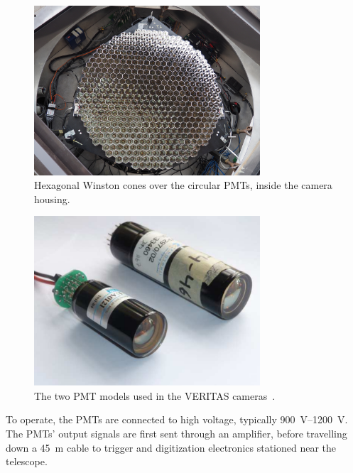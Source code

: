 \begin{figure}[ht]
  \centering
  \includegraphics[width=0.75\textwidth]{images/winston_cones_t2}
  \caption[Winston Cones]{
    Hexagonal Winston cones over the circular PMTs, inside the camera housing.}
  \label{fig:winstcones}
\end{figure}


\begin{figure}[ht]
  \centering
  \includegraphics[width=0.75\textwidth]{images/pmt_models}
  \caption[PMT Models]{
    The two PMT models used in the VERITAS cameras~\cite{pmtmodels}.}
  \label{fig:pmtmodels}
\end{figure}

To operate, the PMTs are connected to high voltage, typically \SIrange{900}{1200}{V}.
%
%
The PMTs' output signals are first sent through an amplifier, before travelling down a \nicetilde{}\SI{45}{m} cable to trigger and digitization electronics stationed near the telescope.

